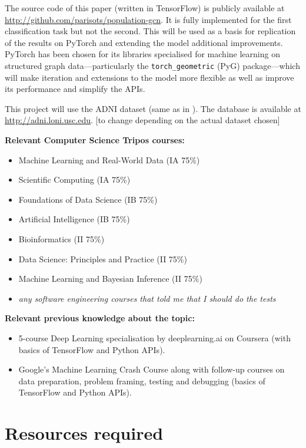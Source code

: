 \documentclass[12pt,a4paper,twoside]{article}
\begin{document}
The source code of this paper (written in TensorFlow) is publicly available at \url{http://github.com/parisots/population-gcn}. It is fully implemented for the first classification task but not the second. This will be used as a basis for replication of the results on PyTorch and extending the model additional improvements. PyTorch has been chosen for its libraries specialised for machine learning on structured graph data—particularly the \texttt{torch\_geometric} (PyG) package—which will make iteration and extensions to the model more flexible as well as improve its performance and simplify the APIs.

This project will use the ADNI dataset (same as in \cite{parisot2017spectral,parisot2018disease}). The database is available at \url{http://adni.loni.usc.edu}. [to change depending on the actual dataset chosen]

\textbf{Relevant Computer Science Tripos courses:}
\begin{itemize}
  \item Machine Learning and Real-World Data (IA 75\%)
  \item Scientific Computing (IA 75\%)
  \item Foundations of Data Science (IB 75\%)
  \item Artificial Intelligence (IB 75\%)
  \item Bioinformatics (II 75\%)
  \item Data Science: Principles and Practice (II 75\%)
  \item Machine Learning and Bayesian Inference (II 75\%)
  \item \textit{any software engineering courses that told me that I should do the tests}
\end{itemize}

\textbf{Relevant previous knowledge about the topic:}
\begin{itemize}
  \item 5-course Deep Learning specialisation by deeplearning.ai on Coursera (with basics of TensorFlow and Python APIs).
  \item Google's Machine Learning Crash Course along with follow-up courses on data preparation, problem framing, testing and debugging (basics of TensorFlow and Python APIs).
\end{itemize}

\section*{Resources required}
\end{document}
